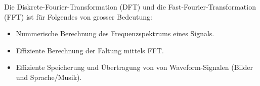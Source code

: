 % 
% 
% 
% 
%

Die Diskrete-Fourier-Transformation (DFT) und die Fast-Fourier-Transformation (FFT) ist für Folgendes von grosser Bedeutung:\\[-0.6cm]
\begin{itemize}
 \item Nummerische Berechnung des Frequenzspektrums eines Signals.\\[-0.6cm]
 \item Effiziente Berechnung der Faltung mittels FFT.\\[-0.6cm]
 \item Effiziente Speicherung und Übertragung von von Waveform-Signalen (Bilder und Sprache/Musik).
\end{itemize}

